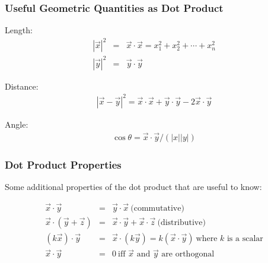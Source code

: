\documentclass{beamer}
\begin{document}
\begin{frame}
  \frametitle{Useful Geometric Quantities as Dot Product}
  

Length:
\begin{eqnarray*}
|\vec{x}|^2 & = & \vec{x} \cdot \vec{x}  =  x_1^2 + x_2^2 + \cdots + x_n^2\\
|\vec{y}|^2 & = & \vec{y} \cdot \vec{y}
\end{eqnarray*}

Distance:
\begin{eqnarray*}
|\vec{x}-\vec{y}|^2 = \vec{x} \cdot \vec{x} + \vec{y} \cdot \vec{y} - 2 \vec{x} \cdot \vec{y}
\end{eqnarray*}

Angle:
\begin{eqnarray*}
\cos \theta = \vec{x} \cdot \vec{y}/(|x||y|)
\end{eqnarray*}

\begin{center}


\end{center}

\end{frame}

\begin{frame}
  \frametitle{Dot Product Properties}

Some additional properties of the dot product that are useful to know:

\begin{eqnarray*}
\vec{x} \cdot \vec{y} & = & \vec{y} \cdot \vec{x} \ \mbox{(commutative)} \\
\vec{x} \cdot (\vec{y} + \vec{z}) & = & \vec{x} \cdot \vec{y} + \vec{x} \cdot \vec{z} \ \mbox{(distributive)}\\
(k\vec{x}) \cdot \vec{y} & = & \vec{x} \cdot (k\vec{y}) = k(\vec{x} \cdot \vec{y}) \ \mbox{where $k$ is a scalar} \\
\vec{x} \cdot \vec{y} & = & 0 \ \mbox{iff $\vec{x}$ and $\vec{y}$ are orthogonal} 
\end{eqnarray*}

\end{frame}
\end{document}
